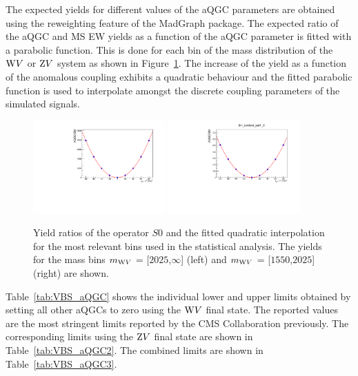 The expected yields for different values of the aQGC parameters are obtained using the reweighting feature of the MadGraph package. The expected ratio of the aQGC and MS EW yields as a function of the aQGC parameter is fitted with a parabolic function. This is done for each bin of the mass distribution of the $\mathrm{W} V$ or $\mathrm{Z} V$ system as shown in Figure~\ref{fig:aqgc_pol}. The increase of the yield as a function of the anomalous coupling exhibits a quadratic behaviour and the fitted parabolic function is used to interpolate amongst the discrete coupling parameters of the simulated signals.      

\begin{figure}[!htbp]
\centering
\includegraphics[width=0.45\textwidth]{Plots/plots/aqgc_pol2.pdf}
\includegraphics[width=0.45\textwidth]{Plots/plots/aqgc_pol2_bin.pdf}
\caption{Yield ratios of the operator $S0$ and the fitted quadratic interpolation for the most relevant bins used in the statistical analysis. The yields for the mass bins $m_{\mathrm{W} V}$ = [$2025$,$\infty$] (left) and  $m_{\mathrm{W} V}$ = [$1550$,$2025$] (right) are shown.}
\label{fig:aqgc_pol}
\end{figure}

Table~\ref{tab:VBS_aQGC} shows the individual lower and upper limits obtained by setting all other aQGCs to zero using the $\mathrm{W} V$ final state. The reported values are the most stringent limits reported by the CMS Collaboration previously. The corresponding limits using the $\mathrm{Z} V$ final state are shown in Table~\ref{tab:VBS_aQGC2}. The combined limits are shown in Table~\ref{tab:VBS_aQGC3}.


